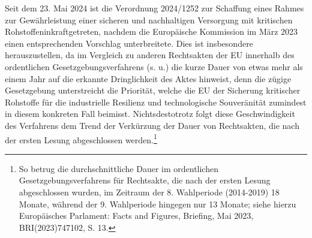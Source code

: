 \documentclass[12pt,a4paper,oneside]{book} %
\begin{document}
	Seit dem 23. Mai 2024 ist die Verordnung 2024/1252 \glqq zur Schaffung eines Rahmes zur Gewährleistung einer sicheren und nachhaltigen Versorgung mit kritischen Rohstoffen\grqq inkraftgetreten, nachdem die Europäische Kommission im März 2023 einen entsprechenden Vorschlag unterbreitete. Dies ist insbesondere herauszustellen, da im Vergleich zu anderen Rechtsakten der EU innerhalb des ordentlichen Gesetzgebungsverfahrens (s. u.) die kurze Dauer von etwas mehr als einem Jahr auf die erkannte Dringlichkeit des Aktes hinweist, denn die zügige Gesetzgebung unterstreicht die Priorität, welche die EU der Sicherung kritischer Rohstoffe für die industrielle Resilienz und technologische Souveränität zumindest in diesem konkreten Fall beimisst. Nichtsdestotrotz folgt diese Geschwindigkeit des Verfahrens dem Trend der Verkürzung der Dauer von Rechtsakten, die nach der ersten Lesung abgeschlossen werden.\footnote{So betrug die durchschnittliche Dauer im ordentlichen Gesetzgebungsverfahrens für Rechtsakte, die nach der ersten Lesung abgeschlossen wurden, im Zeitraum der 8. Wahlperiode (2014-2019) 18 Monate, während der 9. Wahlperiode hingegen nur 13 Monate; siehe hierzu Europäisches Parlament: Facts and Figures, Briefing, Mai 2023, BRI(2023)747102, S. 13.} 
	
\end{document}
